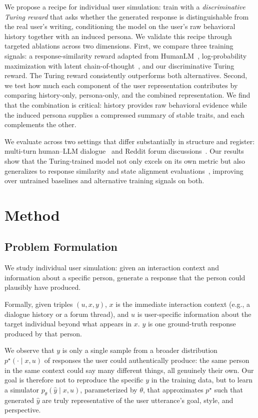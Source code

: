 \documentclass{article}
\begin{document}
We propose a recipe for individual user simulation: train with a \emph{discriminative Turing reward} that asks whether the generated response is distinguishable from the real user's writing, conditioning the model on the user's raw behavioral history together with an induced persona. We validate this recipe through targeted ablations across two dimensions. First, we compare three training signals: a response-similarity reward adapted from HumanLM~\citep{wu2026humanlm}, log-probability maximization with latent chain-of-thought~\citep{gandhi2026dialogue}, and our discriminative Turing reward. The Turing reward consistently outperforms both alternatives. Second, we test how much each component of the user representation contributes by comparing history-only, persona-only, and the combined representation. We find that the combination is critical: history provides raw behavioral evidence while the induced persona supplies a compressed summary of stable traits, and each complements the other.
 
We evaluate across two settings that differ substantially in structure and register: multi-turn human--LLM dialogue~\citep{kirk2024prism} and Reddit forum discussions~\citep{chang2020convokit}. Our results show that the Turing-trained model not only excels on its own metric but also generalizes to response similarity and state alignment evaluations~\citep{wu2026humanlm}, improving over untrained baselines and alternative training signals on both.
 
\section{Method}
 
\subsection{Problem Formulation}\label{sec:problem}

We study individual user simulation: given an interaction context and information about a specific person, generate a response that the person could plausibly have produced.

Formally, given triples $(u, x, y)$, $x$ is the immediate interaction context (e.g., a dialogue history or a forum thread), and $u$ is user-specific information about the target individual beyond what appears in $x$. $y$ is one ground-truth response produced by that person.

We observe that $y$ is only a single sample from a broader distribution $p^\star(\cdot \mid x, u)$ of responses the user could authentically produce: the same person in the same context could say many different things, all genuinely their own. Our goal is therefore not to reproduce the specific $y$ in the training data, but to learn a simulator $p_\theta(\hat{y} \mid x, u)$, parameterized by $\theta$, that approximates $p^\star$ such that generated $\hat{y}$ are truly representative of the user utterance's goal, style, and perspective.
\end{document}
